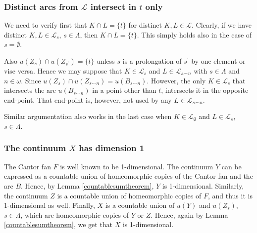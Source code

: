 \documentclass[12pt]{article}
\theoremstyle{definition}
\theoremstyle{remark}
\begin{document}
\subsubsection*{Distinct arcs from $\mathcal L$ intersect in $t$ only}
We need to verify first that $K\cap L=\{t\}$ for distinct $K, L\in\mathcal L$.
Clearly, if we have distinct $K, L\in \mathcal L_s$, $s\in\Lambda$, then $K\cap L=\{t\}$. This simply holds also in the case of $s=\emptyset$.

Also $u(Z_s)\cap u(Z_{s^\prime})=\{t\}$ unless $s$ is a prolongation of $s^\prime$ by one element or vise versa.
Hence we may suppose that $K\in \mathcal L_s$ and $L\in \mathcal L_{s\smallfrown n}$ with $s\in\Lambda$ and $n\in\omega$. Since $u(Z_s)\cap u(Z_{s\smallfrown n})=u(B_{s\smallfrown n})$.
However, the only $K\in \mathcal L_s$ that intersects the arc $u(B_{s\smallfrown n})$ in a point other than $t$, intersects it in the opposite end-point. That end-point is, however, not used by any $L\in\mathcal L_{s\smallfrown n}$.

Similar argumentation also works in the last case when $K\in\mathcal L_\emptyset$ and $L\in\mathcal L_s$, $s\in\Lambda$.











\subsubsection*{The continuum $X$ has dimension 1}

The Cantor fan $F$ is well known to be 1-dimensional.
The continuum $Y$ can be expressed as a countable union of homeomorphic copies of the Cantor fan and the arc $B$. 
Hence, by Lemma \ref{countablesumtheorem}, $Y$ is 1-dimensional.
Similarly, the continuum $Z$ is a countable union of homeomorphic copies of $F$, and thus it is 1-dimensional as well. Finally, $X$ is a countable union of $u(Y)$ and $u(Z_s)$, $s\in\Lambda$, which are homeomorphic copies of $Y$ or $Z$. Hence, again by Lemma \ref{countablesumtheorem}, we get that $X$ is 1-dimensional.
\end{document}
